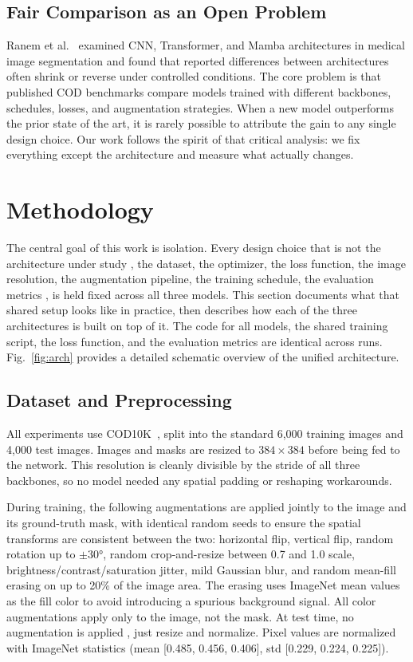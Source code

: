 \documentclass[10pt,conference]{IEEEtran}
\begin{document}
\subsection{Fair Comparison as an Open Problem}
Ranem et al.~\cite{ranem2025cnn_trans_mamba} examined CNN, Transformer, and Mamba architectures in medical image segmentation and found that reported differences between architectures often shrink or reverse under controlled conditions. The core problem is that published COD benchmarks compare models trained with different backbones, schedules, losses, and augmentation strategies. When a new model outperforms the prior state of the art, it is rarely possible to attribute the gain to any single design choice. Our work follows the spirit of that critical analysis: we fix everything except the architecture and measure what actually changes.


\section{Methodology}

The central goal of this work is isolation. Every design choice that is not the architecture under study , the dataset, the optimizer, the loss function, the image resolution, the augmentation pipeline, the training schedule, the evaluation metrics , is held fixed across all three models. This section documents what that shared setup looks like in practice, then describes how each of the three architectures is built on top of it. The code for all models, the shared training script, the loss function, and the evaluation metrics are identical across runs. Fig.~\ref{fig:arch} provides a detailed schematic overview of the unified architecture.

\subsection{Dataset and Preprocessing}
All experiments use COD10K~\cite{fan2020cod}, split into the standard 6,000 training images and 4,000 test images. Images and masks are resized to $384{\times}384$ before being fed to the network. This resolution is cleanly divisible by the stride of all three backbones, so no model needed any spatial padding or reshaping workarounds.

During training, the following augmentations are applied jointly to the image and its ground-truth mask, with identical random seeds to ensure the spatial transforms are consistent between the two: horizontal flip, vertical flip, random rotation up to $\pm30°$, random crop-and-resize between 0.7 and 1.0 scale, brightness/contrast/saturation jitter, mild Gaussian blur, and random mean-fill erasing on up to 20\% of the image area. The erasing uses ImageNet mean values as the fill color to avoid introducing a spurious background signal. All color augmentations apply only to the image, not the mask. At test time, no augmentation is applied , just resize and normalize. Pixel values are normalized with ImageNet statistics (mean [0.485, 0.456, 0.406], std [0.229, 0.224, 0.225]).
\end{document}
